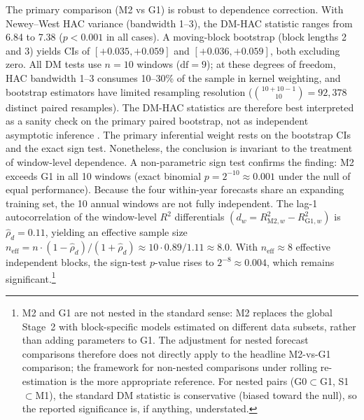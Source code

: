 \documentclass[11pt,a4paper]{article}
\begin{document}
The primary comparison (M2 vs G1) is robust to dependence correction. With Newey--West HAC variance (bandwidth 1--3), the DM-HAC statistic ranges from 6.84 to 7.38 ($p < 0.001$ in all cases). A moving-block bootstrap (block lengths 2 and 3) yields CIs of $[+0.035, +0.059]$ and $[+0.036, +0.059]$, both excluding zero. All DM tests use $n = 10$ windows ($\mathrm{df} = 9$); at these degrees of freedom, HAC bandwidth 1--3 consumes 10--30\% of the sample in kernel weighting, and bootstrap estimators have limited resampling resolution ($\binom{10+10-1}{10} = 92{,}378$ distinct paired resamples). The DM-HAC statistics are therefore best interpreted as a sanity check on the primary paired bootstrap, not as independent asymptotic inference \citep[cf.][for finite-sample bias in HAC estimators]{kiefer2005new}. The primary inferential weight rests on the bootstrap CIs and the exact sign test. Nonetheless, the conclusion is invariant to the treatment of window-level dependence. A non-parametric sign test confirms the finding: M2 exceeds G1 in all 10 windows (exact binomial $p = 2^{-10} \approx 0.001$ under the null of equal performance). Because the four within-year forecasts share an expanding training set, the 10 annual windows are not fully independent. The lag-1 autocorrelation of the window-level $R^2$ differentials $(d_w = R^2_{\mathrm{M2},w} - R^2_{\mathrm{G1},w})$ is $\hat\rho_d = 0.11$, yielding an effective sample size $n_{\mathrm{eff}} = n \cdot (1 - \hat\rho_d)/(1 + \hat\rho_d) \approx 10 \cdot 0.89/1.11 \approx 8.0$. With $n_{\mathrm{eff}} \approx 8$ effective independent blocks, the sign-test $p$-value rises to $2^{-8} \approx 0.004$, which remains significant.\footnote{M2 and G1 are not nested in the standard sense: M2 replaces the global Stage~2 with block-specific models estimated on different data subsets, rather than adding parameters to G1. The \citet{clark2007approximately} adjustment for nested forecast comparisons therefore does not directly apply to the headline M2-vs-G1 comparison; the \citet{giacomini2006tests} framework for non-nested comparisons under rolling re-estimation is the more appropriate reference. For nested pairs (G0$\subset$G1, S1$\subset$M1), the standard DM statistic is conservative (biased toward the null), so the reported significance is, if anything, understated.}
\end{document}
